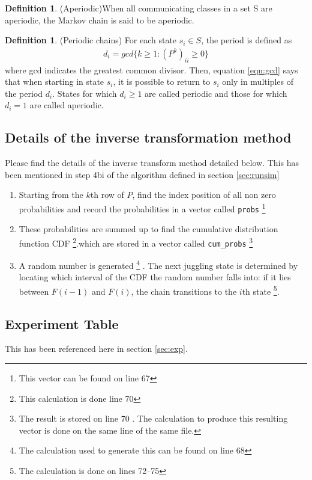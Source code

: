 \documentclass{article}
\theoremstyle{definition}
\newtheorem{definition}[theorem]{Definition}
\theoremstyle{remark}
\numberwithin{equation}{section}
\begin{document}
\begin{definition} (Aperiodic)\label{defn:aperiodic}
When all communicating classes in a set S are aperiodic, the Markov chain is said to be aperiodic.
\end{definition}

\begin{definition} (Periodic chains) 
For each state $s_i \in S$, the period is defined as 
\begin{align}
    \label{eqn:gcd} d_i = gcd\{k \geq 1 : (P^k)_{ii} \geq 0\}
\end{align}
where gcd indicates the greatest common divisor. Then, equation \ref{eqn:gcd} says that when starting in state $s_i$, it is possible to return to $s_i$ only in multiples of the period $d_i$. States for which $d_i \geq 1$ are called periodic and those for which $d_i = 1$ are called aperiodic.
\end{definition}
\subsection{Details of the inverse transformation method} \label{sec:invtrans}
Please find the details of the inverse transform method detailed below. This has been mentioned in step 4bi of the algorithm defined in section \ref{sec:runsim}
\begin{enumerate}
        \item Starting from the $k$th row of $P$, find the index position of all non zero probabilities and record the probabilities in a vector called \lstinline|probs| \footnote{This vector can be found on line 67 }
            \item These probabilities are summed up to find the cumulative distribution function CDF \cite{CDFDefn} \footnote{This calculation is done line 70 }.which are stored in a vector called \lstinline|cum_probs| \footnote{The result is stored on line 70 . The calculation to produce this resulting vector is done on the same line of the same file.}
            \item A random number is generated \footnote{The calculation used to generate this can be found on line 68 } \cite{Rand}. The next juggling state is determined by locating which interval of the CDF the random number falls into: if it lies between $F(i-1)$ and $F(i)$, the chain transitions to the $i$th state \footnote{The calculation is done on lines 72--75 }.
            
        \end{enumerate}
\subsection{Experiment Table}
This has been referenced here in section \ref{sec:exp}.
\end{document}
